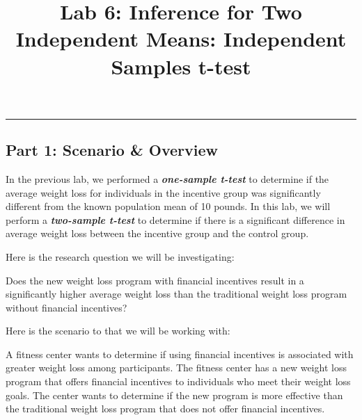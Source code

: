 \documentclass[
  letterpaper,
  DIV=11,
  numbers=noendperiod]{scrartcl}
\title{Lab 6: Inference for Two Independent Means: Independent Samples
t-test}
\author{}
\date{}
\begin{document}
\maketitle


\begin{center}\rule{0.5\linewidth}{0.5pt}\end{center}

\subsection{Part 1: Scenario \&
Overview}\label{part-1-scenario-overview}

In the previous lab, we performed a \textbf{\emph{one-sample t-test}} to
determine if the average weight loss for individuals in the incentive
group was significantly different from the known population mean of 10
pounds. In this lab, we will perform a \textbf{\emph{two-sample t-test}}
to determine if there is a significant difference in average weight loss
between the incentive group and the control group.

Here is the research question we will be investigating:

\begin{tcolorbox}[enhanced jigsaw, opacityback=0, colbacktitle=quarto-callout-tip-color!10!white, colframe=quarto-callout-tip-color-frame, leftrule=.75mm, bottomtitle=1mm, titlerule=0mm, title=\textcolor{quarto-callout-tip-color}{\faLightbulb}\hspace{0.5em}{Research Question}, opacitybacktitle=0.6, toptitle=1mm, colback=white, bottomrule=.15mm, rightrule=.15mm, breakable, arc=.35mm, toprule=.15mm, left=2mm, coltitle=black]

Does the new weight loss program with financial incentives result in a
significantly higher average weight loss than the traditional weight
loss program without financial incentives?

\end{tcolorbox}

Here is the scenario to that we will be working with:

A fitness center wants to determine if using financial incentives is
associated with greater weight loss among participants. The fitness
center has a new weight loss program that offers financial incentives to
individuals who meet their weight loss goals. The center wants to
determine if the new program is more effective than the traditional
weight loss program that does not offer financial incentives.
\end{document}
